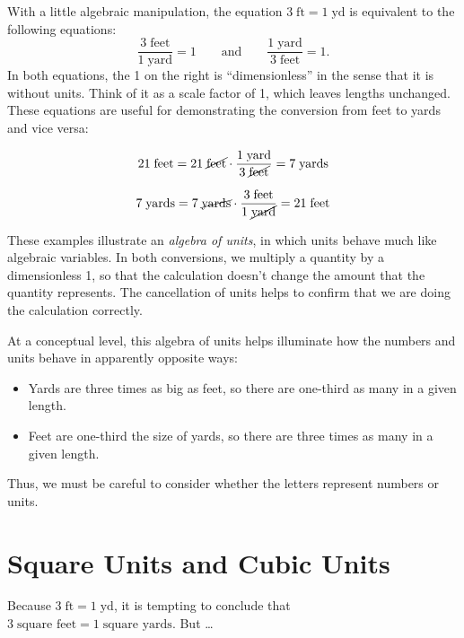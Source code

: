 \documentclass[nooutcomes]{ximera}
\begin{document}
With a little algebraic manipulation, the equation $3\;\textrm{ft} = 1\;\textrm{yd}$ is equivalent to the following equations:  
\[
\frac{3\;\textrm{feet}}{1\;\textrm{yard}} = 1\qquad \textrm{and}\qquad \frac{1\;\textrm{yard}}{3\;\textrm{feet}} = 1.
\]
In both equations, the 1 on the right is ``dimensionless'' in the sense that it is without units.  Think of it as a scale factor of 1, which leaves lengths unchanged.  These equations are useful for demonstrating the conversion from feet to yards and vice versa:  


\[
21\;\textrm{feet} = 21\;\cancel{\textrm{feet}} \cdot \frac{{1\;\textrm{yard}}}{3\;\cancel{\textrm{feet}}} = 7\;\textrm{yards}
\]

\[
7\;\textrm{yards} = 7\;\cancel{\textrm{yards}} \cdot \frac{{3\;\textrm{feet}}}{1\;\cancel{\textrm{yard}}} = 
21\;\textrm{feet}
\]

These examples illustrate an \emph{algebra of units}, in which units behave much like algebraic variables.  In both conversions, we multiply a quantity by a dimensionless 1, so that the calculation doesn't change the amount that the quantity represents.  The cancellation of units helps to confirm that we are doing the calculation correctly.  

At a conceptual level, this algebra of units helps illuminate how the numbers and units behave in apparently opposite ways:  

\begin{itemize}
\item Yards are three times as big as feet, so there are one-third as many in a given length.  
\item Feet are one-third the size of yards, so there are three times as many in a given length.  
\end{itemize}

Thus, we must be careful to consider whether the letters represent numbers or units.  


\section{Square Units and Cubic Units}
Because $3\;\textrm{ft} = 1 \;\textrm{yd}$, it is tempting to conclude that $3\;\textrm{square feet} = 1 \;\textrm{square yards}$.  But \dots
\end{document}
